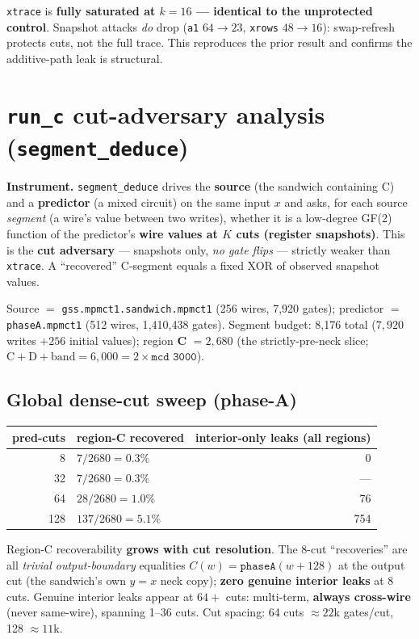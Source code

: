 \documentclass[11pt]{article}
\newcommand{\code}[1]{\texttt{#1}}
\begin{document}
\noindent\code{xtrace} is \textbf{fully saturated at $k=16$ --- identical to the
unprotected control}. Snapshot attacks \emph{do} drop (\code{a1} $64\!\to\!23$,
\code{xrows} $48\!\to\!16$): swap-refresh protects cuts, not the full trace. This
reproduces the prior result and confirms the additive-path leak is structural.

\section{\texttt{run\_c} cut-adversary analysis (\texttt{segment\_deduce})}

\textbf{Instrument.} \code{segment\_deduce} drives the \textbf{source} (the sandwich
containing C) and a \textbf{predictor} (a mixed circuit) on the same input $x$ and
asks, for each source \emph{segment} (a wire's value between two writes), whether it
is a low-degree GF(2) function of the predictor's \textbf{wire values at $K$ cuts
(register snapshots)}. This is the \textbf{cut adversary} --- snapshots only, \emph{no
gate flips} --- strictly weaker than \code{xtrace}. A ``recovered'' C-segment equals a
fixed XOR of observed snapshot values.

Source $=$ \code{gss.mpmct1.sandwich.mpmct1} (256 wires, 7{,}920 gates); predictor $=$
\code{phaseA.mpmct1} (512 wires, 1{,}410{,}438 gates). Segment budget: 8{,}176 total
($7{,}920$ writes $+ 256$ initial values); region \textbf{C} $= 2{,}680$ (the
strictly-pre-neck slice; $\text{C}+\text{D}+\text{band} = 6{,}000 = 2\times \code{mcd
3000}$).

\subsection{Global dense-cut sweep (phase-A)}

\begin{center}
\begin{tabular}{r l r}
\toprule
pred-cuts & region-C recovered & interior-only leaks (all regions) \\
\midrule
8   & $7/2680 = 0.3\%$   & 0 \\
32  & $7/2680 = 0.3\%$   & --- \\
64  & $28/2680 = 1.0\%$  & 76 \\
128 & $137/2680 = 5.1\%$ & 754 \\
\bottomrule
\end{tabular}
\end{center}

Region-C recoverability \textbf{grows with cut resolution}. The 8-cut ``recoveries''
are all \emph{trivial output-boundary} equalities $C(w) = \code{phaseA}(w{+}128)$ at
the output cut (the sandwich's own $y{=}x$ neck copy); \textbf{zero genuine interior
leaks} at 8 cuts. Genuine interior leaks appear at $64+$ cuts: multi-term,
\textbf{always cross-wire} (never same-wire), spanning 1--36 cuts. Cut spacing: 64
cuts $\approx 22$k gates/cut, 128 $\approx 11$k.
\end{document}
